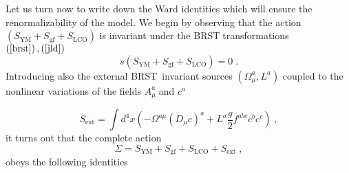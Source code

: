 \documentclass[a4paper,12pt]{article}
\begin{document}
Let us turn now to write down the Ward identities which will ensure the
renormalizability of the model. We begin by observing that the action $%
\left( S_{\mathrm{YM}}+S_{\mathrm{gf}}+S_{\mathrm{LCO}}\right) $ is
invariant under the BRST$\;$transformations\ $\left( \ref{brst}\right)
,\left( \ref{jld}\right) $%
\begin{equation}
s\left( S_{\mathrm{YM}}+S_{\mathrm{gf}}+S_{\mathrm{LCO}}\right) =0\;.
\label{a}
\end{equation}
Introducing also the external BRST\ invariant sources $\left( \Omega _{\mu
}^{a},L^{a}\right) $ coupled to the nonlinear variations of the fields $%
A_{\mu }^{a}\;$and $c^{a}$ \cite{book}

\begin{equation}
S_{\mathrm{ext}}=\int d^{4}x\left( -\Omega ^{a\mu }\left( D_{\mu }c\right)
^{a}+L^{a}\frac{g}{2}f^{abc}c^{b}c^{c}\right) \;,  \label{sext}
\end{equation}
it turns out that the complete action 
\begin{equation}
\Sigma =S_{\mathrm{YM}}+S_{\mathrm{gf}}+S_{\mathrm{LCO}}+S_{\mathrm{ext}}\;,
\label{ca}
\end{equation}
obeys the following identities \cite{book}
\end{document}
